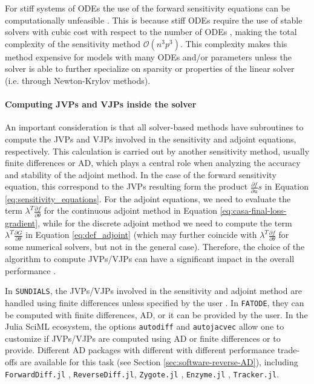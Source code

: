 For stiff systems of ODEs the use of the forward sensitivity equations can be computationally unfeasible \cite{kim_stiff_2021}.
This is because stiff ODEs require the use of stable solvers with cubic cost with respect to the number of ODEs \cite{hairer-solving-2}, making the total complexity of the sensitivity method $\mathcal{O}(n^3p^3)$. 
This complexity makes this method expensive for models with many ODEs and/or parameters unless the solver is able to further specialize on sparsity or properties of the linear solver (i.e. through Newton-Krylov methods). 

\paragraph{Computing JVPs and VJPs inside the solver}
\label{section:computing-vjp-inside-solver}

An important consideration is that all solver-based methods have subroutines to compute the JVPs and VJPs involved in the sensitivity and adjoint equations, respectively. 
This calculation is carried out by another sensitivity method, usually finite differences or AD, which plays a central role when analyzing the accuracy and stability of the adjoint method. 
In the case of the forward sensitivity equation, this correspond to the JVPs resulting form the product $\frac{\partial f}{\partial u} s $ in Equation \eqref{eq:sensitivity_equations}.
For the adjoint equations, we need to evaluate the term $\lambda^T \frac{\partial f}{\partial \theta}$ for the continuous adjoint method in Equation \eqref{eq:casa-final-loss-gradient}, while for the discrete adjoint method we need to compute the term $\lambda^T \frac{\partial G}{\partial \theta}$ in Equation \eqref{eq:def_adjoint} (which may further coincide with $\lambda^T \frac{\partial f}{\partial \theta}$ for some numerical solvers, but not in the general case). 
Therefore, the choice of the algorithm to compute JVPs/VJPs can have a significant impact in the overall performance \cite{Schäfer_Tarek_White_Rackauckas_2021}. 

In \texttt{SUNDIALS}, the JVPs/VJPs involved in the sensitivity and adjoint method are handled using finite differences unless specified by the user \cite{SUNDIALS-hindmarsh2005sundials}.
In \texttt{FATODE}, they can be computed with finite differences, AD, or it can be provided by the user.
In the Julia SciML ecosystem, the options \texttt{autodiff} and \texttt{autojacvec} allow one to customize if JVPs/VJPs are computed using AD or finite differences or to provide. 
Different AD packages with different with different performance trade-offs are available for this task (see Section \ref{sec:software-reverse-AD}), including \texttt{ForwardDiff.jl} \cite{RevelsLubinPapamarkou2016}, \texttt{ReverseDiff.jl}, \texttt{Zygote.jl} \cite{Innes_Zygote}, \texttt{Enzyme.jl} \cite{moses_Enzyme}, \texttt{Tracker.jl}.


